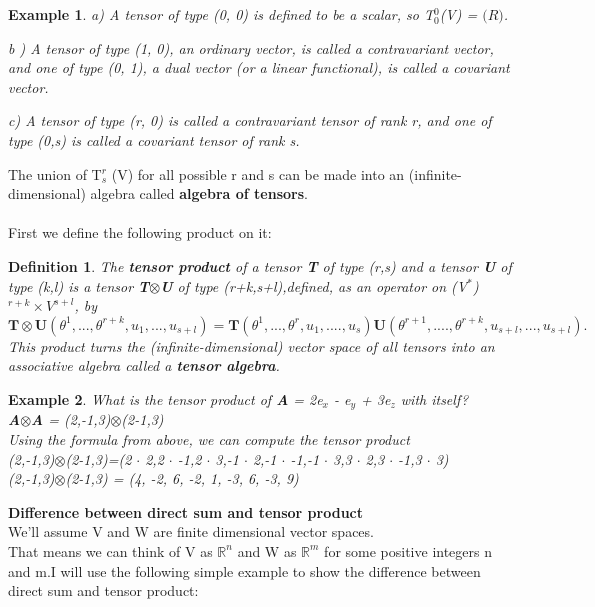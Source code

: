 \documentclass[12pt,a4paper]{article}
\newtheorem{defn}[thm]{Definition}
\newtheorem{exmp}{Example}[section]
\begin{document}
\begin{exmp}
\item[a)]A tensor of type (0, 0) is defined to be a scalar, so T$^0_0$(V) = $\mathbb(R)$.
\item[b]) A tensor of type (1, 0), an ordinary vector, is called a contravariant vector, and one
of type (0, 1), a dual vector (or a linear functional), is called a covariant
vector.
\item[c)] A tensor of type (r, 0) is called a contravariant tensor of rank r,
and one of type (0,s) is called a covariant tensor of rank s.
\end{exmp}
The union of T$^r_s$ (V) for all possible r and s can be made into an (infinite-dimensional) algebra called \textbf{algebra of tensors}.\\\\
First we define the following product on it:
\begin{defn}
The \textbf{tensor product} of a tensor \textbf{T} of type (r,s) and a tensor \textbf{U} of type (k,l) is a tensor \textbf{T}$\otimes$\textbf{U} of type (r+k,s+l),defined, as an operator on (V$^*$)$^{r+k}\times V^{s+l}$, by \begin{equation}
\textbf{T}\otimes\textbf{U}(\theta^1,...,\theta^{r+k},u_1,...,u_{s+l}) = \textbf{T}(\theta^1,...,\theta^r,u_1,....,u_s)\textbf{U}(\theta^{r+1},....,\theta^{r+k},u_{s+l},...,u_{s+l}).
\end{equation}
This product turns the (infinite-dimensional) vector space of all tensors into an associative algebra called a \textbf{tensor algebra}.
\end{defn}
\begin{exmp}
What is the tensor product of \textbf{A} = 2e$_x$ - e$_y$ + 3e$_z$ with itself?\\
\textbf{A}$\otimes$\textbf{A} = (2,-1,3)$\otimes$(2-1,3)\\
Using the formula from above, we can compute the tensor product\\
(2,-1,3)$\otimes$(2-1,3)=(2 $\cdot$ 2,2 $\cdot$ -1,2 $\cdot$ 3,-1 $\cdot$ 2,-1 $\cdot$ -1,-1 $\cdot$ 3,3 $\cdot$ 2,3 $\cdot$ -1,3 $\cdot$ 3)\\
(2,-1,3)$\otimes$(2-1,3) = (4, -2, 6, -2, 1, -3, 6, -3, 9)

\end{exmp}
\textbf{Difference between direct sum and tensor product}\\
We'll assume V and W are finite dimensional vector spaces. \\That means we can think of V as $\mathbb{R}^n$ and W as $\mathbb{R}^m$ for some positive integers n and m.I will use the following simple example to show the difference between direct sum and tensor product:\\
\end{document}
